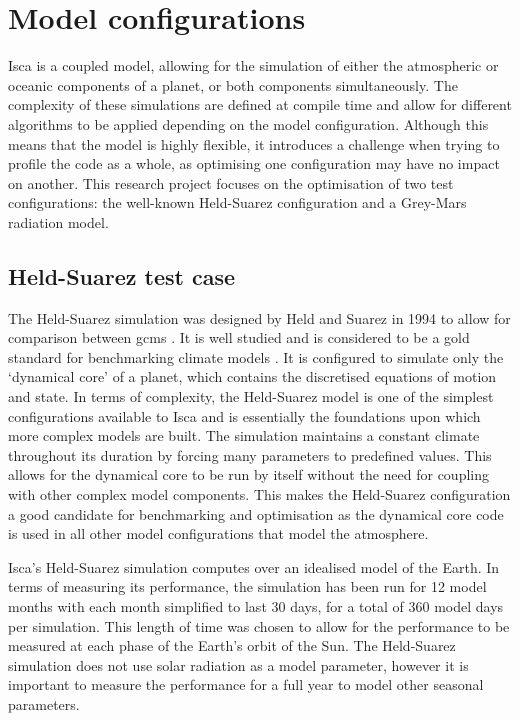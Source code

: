 \documentclass[a4paper,11pt]{report}
\begin{document}
\section{Model configurations}
Isca is a coupled model, allowing for the simulation of either the atmospheric or oceanic components of a planet, or both components simultaneously. The complexity of these simulations are defined at compile time and allow for different algorithms to be applied depending on the model configuration. Although this means that the model is highly flexible, it introduces a challenge when trying to profile the code as a whole, as optimising one configuration may have no impact on another. This research project focuses on the optimisation of two test configurations: the well-known Held-Suarez configuration and a Grey-Mars radiation model.

\subsection{Held-Suarez test case}
The Held-Suarez simulation was designed by Held and Suarez in 1994 to allow for comparison between \gls{gcm}s \cite{held1994proposal}. It is well studied and is considered to be a gold standard for benchmarking climate models \cite{wan2008ensemble, duben2014benchmark, taylor1998performance}. It is configured to simulate only the `dynamical core' of a planet, which contains the discretised equations of motion and state. In terms of complexity, the Held-Suarez model is one of the simplest configurations available to Isca and is essentially the foundations upon which more complex models are built. The simulation maintains a constant climate throughout its duration by forcing many parameters to predefined values. This allows for the dynamical core to be run by itself without the need for coupling with other complex model components. This makes the Held-Suarez configuration a good candidate for benchmarking and optimisation as the dynamical core code is used in all other model configurations that model the atmosphere. 
\par
Isca's Held-Suarez simulation computes over an idealised model of the Earth. In terms of measuring its performance, the simulation has been run for 12 model months with each month simplified to last 30 days, for a total of 360 model days per simulation. This length of time was chosen to allow for the performance to be measured at each phase of the Earth's orbit of the Sun. The Held-Suarez simulation does not use solar radiation as a model parameter, however it is important to measure the performance for a full year to model other seasonal parameters.
\end{document}
